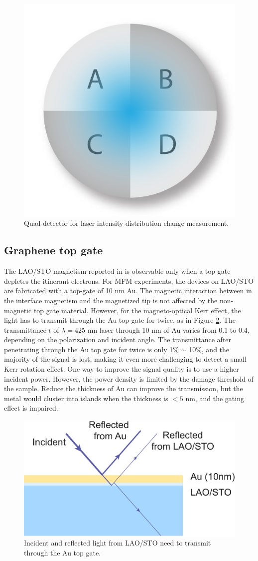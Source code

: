 \documentclass[pdflatex, sectionletters, 12pt]{pittetd}    %
\begin{document}
\begin{figure}[h!]
	\centering
	\includegraphics[width=.25\textwidth]{Drawing/Quad.pdf}
	\caption{Quad-detector for laser intensity distribution change measurement.}
	\label{FIG:Quad}
\end{figure}

\subsection{Graphene top gate}

The LAO/STO magnetism reported in \cite{bi2014room} is observable only when a top gate depletes the itinerant electrons. For MFM experiments, the devices on LAO/STO are fabricated with a top-gate of 10 nm Au. The magnetic interaction between in the interface magnetism and the magnetized tip is not affected by the non-magnetic top gate material. However, for the magneto-optical Kerr effect, the light has to transmit through the Au top gate for twice, as in Figure \ref{FIG:KerrTopGate}. The transmittance $t$ of $\lambda = 425$ nm laser through 10 nm of Au varies from 0.1 to 0.4, depending on the polarization and incident angle\cite{smith1986noble}. The transmittance after penetrating through the Au top gate for twice is only 1\% $\sim$ 10\%, and the majority of the signal is lost, making it even more challenging to detect a small Kerr rotation effect. One way to improve the signal quality is to use a higher incident power. However, the power density is limited by the damage threshold of the sample. Reduce the thickness of Au can improve the transmission, but the metal would cluster into islands when the thickness is $< 5$ nm, and the gating effect is impaired.
\\

\begin{figure}[h!]
	\centering
	\includegraphics[width=.55\textwidth]{Drawing/KerrTopGate.pdf}
	\caption{Incident and reflected light from LAO/STO need to transmit through the Au top gate.}
	\label{FIG:KerrTopGate}
\end{figure}
\end{document}
